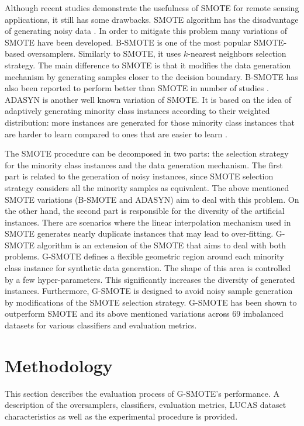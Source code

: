 \documentclass[remotesensing,article,submit,moreauthors,pdftex]{Definitions/mdpi}
\begin{document}
Although recent studies demonstrate the usefulness of SMOTE for remote sensing
applications, it still has some drawbacks. SMOTE algorithm has the disadvantage
of generating noisy data \cite{Douzas2017}. In order to mitigate this problem
many variations of SMOTE have been developed. B-SMOTE \cite{Han2005} is one of
the most popular SMOTE-based oversamplers. Similarly to SMOTE, it uses
$k$-nearest neighbors selection strategy. The main difference to SMOTE is that
it modifies the data generation mechanism by generating samples closer to the
decision boundary. B-SMOTE has also been reported to perform better than SMOTE
in number of studies \cite{Nguyen2009, Ramentol2012}. ADASYN is another well
known variation of SMOTE. It is based on the idea of adaptively generating
minority class instances according to their weighted distribution: more
instances are generated for those minority class instances that are harder to
learn compared to ones that are easier to learn \cite{HaiboHe2008}.

The SMOTE procedure can be decomposed in two parts: the selection strategy for
the minority class instances and the data generation mechanism. The first part
is related to the generation of noisy instances, since SMOTE selection strategy
considers all the minority samples as equivalent. The above mentioned SMOTE
variations (B-SMOTE and ADASYN) aim to deal with this problem. On the other
hand, the second part is responsible for the diversity of the artificial
instances. There are scenarios where the linear interpolation mechanism used in
SMOTE generates nearly duplicate instances that may lead to over-fitting.
G-SMOTE algorithm is an extension of the SMOTE that aims to deal with both
problems. G-SMOTE defines a flexible geometric region around each minority class
instance for synthetic data generation. The shape of this area is controlled by
a few hyper-parameters. This significantly increases the diversity of generated
instances. Furthermore, G-SMOTE is designed to avoid noisy sample generation by
modifications of the SMOTE selection strategy. G-SMOTE has been shown to
outperform SMOTE and its above mentioned variations across 69 imbalanced
datasets for various classifiers and evaluation metrics.

\section{Methodology}

This section describes the evaluation process of G-SMOTE's performance. A
description of the oversamplers, classifiers, evaluation metrics, LUCAS dataset
characteristics as well as the experimental procedure is provided.
\end{document}
